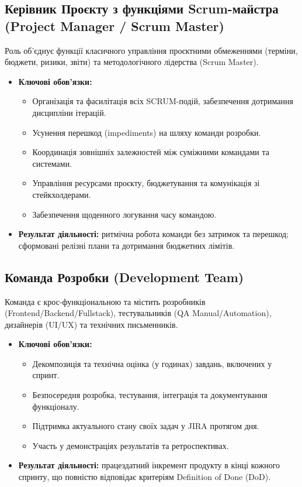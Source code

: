 \documentclass{article}
\begin{document}
\subsection{Керівник Проєкту з функціями Scrum-майстра (Project Manager / Scrum Master)}
Роль об'єднує функції класичного управління проєктними обмеженнями (терміни, бюджети, ризики, звіти) та методологічного лідерства (Scrum Master).
\begin{itemize}
    \item \textbf{Ключові обов'язки:}
    \begin{itemize}
        \item Організація та фасилітація всіх SCRUM-подій, забезпечення дотримання дисципліни ітерацій.
        \item Усунення перешкод (impediments) на шляху команди розробки.
        \item Координація зовнішніх залежностей між суміжними командами та системами.
        \item Управління ресурсами проєкту, бюджетування та комунікація зі стейкхолдерами.
        \item Забезпечення щоденного логування часу командою.
    \end{itemize}
    \item \textbf{Результат діяльності:} ритмічна робота команди без затримок та перешкод; сформовані релізні плани та дотримання бюджетних лімітів.
\end{itemize}

\subsection{Команда Розробки (Development Team)}
Команда є крос-функціональною та містить розробників (Frontend/Backend/Fullstack), тестувальників (QA Manual/Automation), дизайнерів (UI/UX) та технічних письменників.
\begin{itemize}
    \item \textbf{Ключові обов'язки:}
    \begin{itemize}
        \item Декомпозиція та технічна оцінка (у годинах) завдань, включених у спринт.
        \item Безпосередня розробка, тестування, інтеграція та документування функціоналу.
        \item Підтримка актуального стану своїх задач у JIRA протягом дня.
        \item Участь у демонстраціях результатів та ретроспективах.
    \end{itemize}
    \item \textbf{Результат діяльності:} працездатний інкремент продукту в кінці кожного спринту, що повністю відповідає критеріям Definition of Done (DoD).
\end{itemize}
\end{document}

